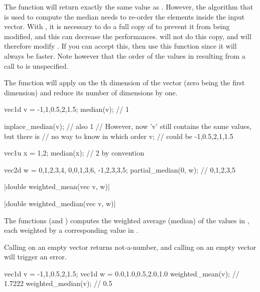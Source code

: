 The function  will return exactly the same value as . However, the algorithm that is used to compute the median needs to re-order the elements inside the input vector. With , it is necessary to do a full copy of  to prevent it from being modified, and this can decrease the performances.  will not do this copy, and will therefore modify . If you can accept this, then use this function since it will always be faster. Note however that the order of the values in  resulting from a call to  is unspecified.

The function  will apply  on the th dimension of the vector (zero being the first dimension) and reduce its number of dimensions by one.

\begin{example}
\begin{cppcode}
vec1d v = {-1,1,0.5,2,1.5};
median(v); // 1

inplace_median(v); // also 1
// However, now 'v' still contains the same values, but there is
// no way to know in which order
v; // could be {-1,0.5,2,1,1.5}

vec1u x = {1,2};
median(x); // 2 by convention

vec2d w = {{0,1,2,3,4}, {0,0,1,3,6}, {-1,2,3,3,5}};
partial_median(0, w); // {0,1,2,3,5}
\end{cppcode}
\end{example}

\funcitem \cppinline|double weighted_mean(vec v, w)| 

\cppinline|double weighted_median(vec v, w)| 

The functions  (and ) computes the weighted average (median) of the values in , each weighted by a corresponding value in .

Calling  on an empty vector returns not-a-number, and calling  on an empty vector will trigger an error.

\begin{example}
\begin{cppcode}
vec1d v = {-1,1,0.5,2,1.5};
vec1d w = {0.0,1.0,0.5,2.0,1.0}
weighted_mean(v); // 1.7222
weighted_median(v); // 0.5
\end{cppcode}
\end{example}

